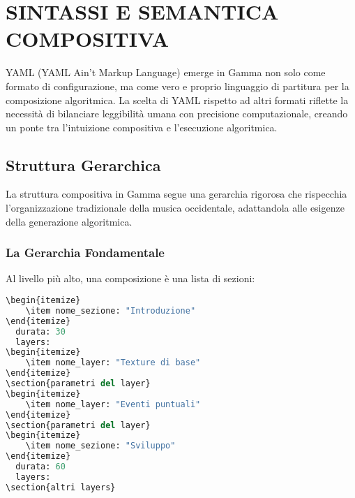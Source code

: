
\section{SINTASSI E SEMANTICA COMPOSITIVA}
YAML (YAML Ain't Markup Language) emerge in Gamma non solo come formato di configurazione, ma come vero e proprio linguaggio di partitura per la composizione algoritmica. La scelta di YAML rispetto ad altri formati riflette la necessità di bilanciare leggibilità umana con precisione computazionale, creando un ponte tra l'intuizione compositiva e l'esecuzione algoritmica.
\subsection{Struttura Gerarchica}
La struttura compositiva in Gamma segue una gerarchia rigorosa che rispecchia l'organizzazione tradizionale della musica occidentale, adattandola alle esigenze della generazione algoritmica.
\subsubsection{La Gerarchia Fondamentale}
Al livello più alto, una composizione è una lista di sezioni:

\begin{lstlisting}[language=Python]
\begin{itemize}
    \item nome_sezione: "Introduzione"
\end{itemize}
  durata: 30
  layers:
\begin{itemize}
    \item nome_layer: "Texture di base"
\end{itemize}
\section{parametri del layer}
\begin{itemize}
    \item nome_layer: "Eventi puntuali"
\end{itemize}
\section{parametri del layer}
\begin{itemize}
    \item nome_sezione: "Sviluppo"
\end{itemize}
  durata: 60
  layers:
\section{altri layers}
\end{lstlisting}

